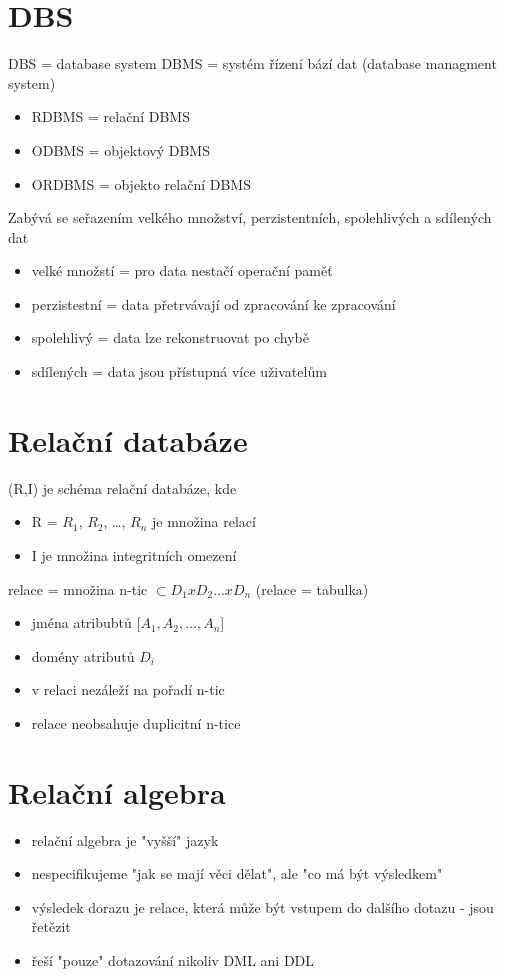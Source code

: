 \documentclass{szzclass}
\begin{document}
\tableofcontents
\newpage

\section{DBS}
DBS = database system \newline
DBMS = systém řízení bází dat (database managment system)
\begin{itemize}
  \item RDBMS = relační DBMS
  \item ODBMS = objektový DBMS
  \item ORDBMS = objekto relační DBMS
\end{itemize}

Zabývá se seřazením velkého množství, perzistentních, spolehlivých a sdílených dat
\begin{itemize}
  \item velké množstí = pro data nestačí operační paměť
  \item perzistestní = data přetrvávají od zpracování ke zpracování
  \item spolehlivý = data lze rekonstruovat po chybě
  \item sdílených = data jsou přístupná více uživatelům
\end{itemize}
\section{Relační databáze}
(R,I) je schéma relační databáze, kde
\begin{itemize}
  \item R = {$R_1$, $R_2$, \dots, $R_n$} je množina relací
  \item I je množina integritních omezení
\end{itemize}

relace = množina n-tic $\subset D_1 x D_2 \dots x D_n$ (relace = tabulka)
\begin{itemize}
  \item jména atribubtů [$A_1, A_2, \dots, A_n$]
  \item domény atributů $D_i$
  \item v relaci nezáleží na pořadí n-tic
  \item relace neobsahuje duplicitní n-tice
\end{itemize}
\section{Relační algebra}
\begin{itemize}
  \item relační algebra je "vyšší" jazyk
  \item nespecifikujeme "jak se mají věci dělat", ale "co má být výsledkem"
  \item výsledek dorazu je relace, která může být vstupem do dalšího dotazu - jsou řetězit
  \item řeší "pouze" dotazování nikoliv DML ani DDL
\end{itemize}
\end{document}
